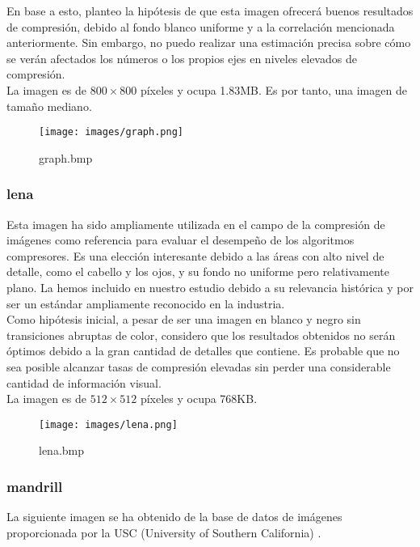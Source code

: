 \documentclass[12pt,a4paper]{article}
\begin{document}
En base a esto, planteo la hipótesis de que esta imagen ofrecerá buenos resultados de compresión, debido al fondo blanco uniforme y a la correlación mencionada anteriormente. Sin embargo, no puedo realizar una estimación precisa sobre cómo se verán afectados los números o los propios ejes en niveles elevados de compresión.\\

La imagen es de $800\times800$ píxeles y ocupa 1.83MB. Es por tanto, una imagen de tamaño mediano.\\

\begin{figure}[H]
    \centering
    \texttt{[image: images/graph.png]}
    \caption{graph.bmp}
    
\end{figure}

\break
\subsubsection{lena}
Esta imagen ha sido ampliamente utilizada en el campo de la compresión de imágenes como referencia para evaluar el desempeño de los algoritmos compresores. Es una elección interesante debido a las áreas con alto nivel de detalle, como el cabello y los ojos, y su fondo no uniforme pero relativamente plano. La hemos incluido en nuestro estudio debido a su relevancia histórica y por ser un estándar ampliamente reconocido en la industria.\\

Como hipótesis inicial, a pesar de ser una imagen en blanco y negro sin transiciones abruptas de color, considero que los resultados obtenidos no serán óptimos debido a la gran cantidad de detalles que contiene. Es probable que no sea posible alcanzar tasas de compresión elevadas sin perder una considerable cantidad de información visual.\\

La imagen es de $512\times512$ píxeles y ocupa 768KB.\\

\begin{figure}[H]
    \centering
    \texttt{[image: images/lena.png]}
    \caption{lena.bmp}
    
\end{figure}

\break
\subsubsection{mandrill}
La siguiente imagen se ha obtenido de la base de datos de imágenes proporcionada por la USC (University of Southern California) \cite{USCSIPI-Database}.\\
\end{document}
